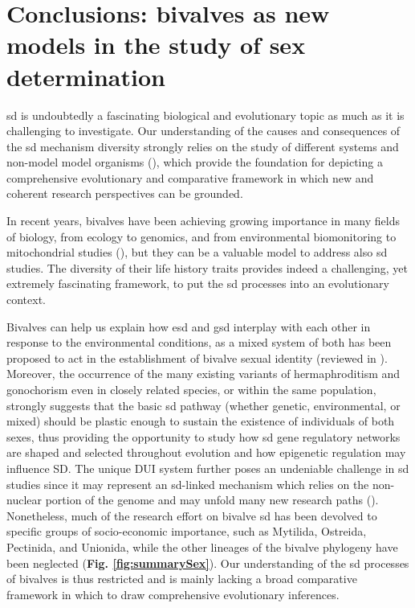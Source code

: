 \section{Conclusions: bivalves as new models in the study of sex determination}
\gls{sd} is undoubtedly a fascinating biological and evolutionary topic as much as it is challenging to investigate. Our understanding of the causes and consequences of the \gls{sd} mechanism diversity strongly relies on the study of different systems and non-model model organisms (\textbf{\cite{bachtrog2014sex,milani2020faraway}}), which provide the foundation for depicting a comprehensive evolutionary and comparative framework in which new and coherent research perspectives can be grounded.

In recent years, bivalves have been achieving growing importance in many fields of biology, from ecology to genomics, and from environmental biomonitoring to mitochondrial studies (\textbf{\cite{milani2020faraway,ghiselli2021bivalve}}), but they can be a valuable model to address also \gls{sd} studies. The diversity of their life history traits provides indeed a challenging, yet extremely fascinating framework, to put the \gls{sd} processes into an evolutionary context.

Bivalves can help us explain how \gls{esd} and \gls{gsd} interplay with each other in response to the environmental conditions, as a mixed system of both has been proposed to act in the establishment of bivalve sexual identity (reviewed in \textbf{\cite{breton2018sex}}). Moreover, the occurrence of the many existing variants of hermaphroditism and gonochorism even in closely related species, or within the same population, strongly suggests that the basic \gls{sd} pathway (whether genetic, environmental, or mixed) should be plastic enough to sustain the existence of individuals of both sexes, thus providing the opportunity to study how \gls{sd} gene regulatory networks are shaped and selected throughout evolution and how epigenetic regulation may influence SD. The unique DUI system further poses an undeniable challenge in \gls{sd} studies since it may represent an \gls{sd}-linked mechanism which relies on the non-nuclear portion of the genome and may unfold many new research paths (\textbf{\cite{milani2020faraway,ghiselli2021bivalve}}). Nonetheless, much of the research effort on bivalve \gls{sd} has been devolved to specific groups of socio-economic importance, such as Mytilida, Ostreida, Pectinida, and Unionida, while the other lineages of the bivalve phylogeny have been neglected (\textbf{Fig. \ref{fig:summarySex}}). Our understanding of the \gls{sd} processes of bivalves is thus restricted and is mainly lacking a broad comparative framework in which to draw comprehensive evolutionary inferences.

